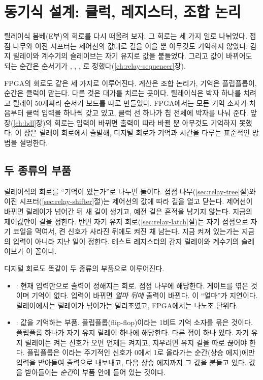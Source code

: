\chapter{동기식 설계: 클럭, 레지스터, 조합 논리}\label{ch:sync}

릴레이식 봄베(E부)의 회로를 다시 떠올려 보자. 그 회로는 세 가지 일로 나뉘었다. 접점 나무와 이진 시프터는
제어선의 값대로 길을 이을 뿐 아무것도 기억하지 않았다. 감지 릴레이와 계수기의 슬레이브는 자기 유지로 값을
붙들었다. 그리고 값이 바뀌어도 되는 순간은 순서기가 , , , 로
정했다(\ref{ch:relay-sequencer}장).

FPGA의 회로도 같은 세 가지로 이루어진다. 계산은 조합 논리가, 기억은 플립플롭이, 순간은 클럭이 맡는다.
다른 것은 대가를 치르는 곳이다. 릴레이식은 박자 하나를 치려고 릴레이 50개짜리 순서기 보드를 따로 만들었다.
FPGA에서는 모든 기억 소자가 처음부터 클럭 입력을 하나씩 갖고 있고, 클럭 선 하나가 칩 전체에 박자를 나눠
준다. 앞 장(\ref{ch:hdl}장)의 회로는 입력이 바뀌면 출력이 따라 바뀔 뿐 아무것도 기억하지 못했다. 이 장은
릴레이 회로에서 출발해, 디지털 회로가 기억과 시간을 다루는 표준적인 방법을 설명한다.

\section{두 종류의 부품}

\Relay 릴레이식의 회로를 ``기억이 있는가''로 나누면 둘이다. 접점 나무(\ref{sec:relay-tree}절)와 이진
시프터(\ref{sec:relay-shifter}절)는 제어선의 값에 따라 길을 열고 닫는다. 제어선이 바뀌면 릴레이가 넘어간 뒤
새 길이 생기고, 예전 길은 흔적을 남기지 않는다. 지금의 제어값만이 길을 정한다. 반면 자기 유지
회로(\ref{sec:relay-latch}절)는 자기 접점으로 자기 코일을 먹여서, 켠 신호가 사라진 뒤에도 켜진 채 남는다.
지금 켜져 있는가는 지금의 입력이 아니라 지난 일이 정한다. 테스트 레지스터의 감지 릴레이와 계수기의 슬레이브가
이 꼴이다.

디지털 회로도 똑같이 두 종류의 부품으로 이루어진다.

\begin{itemize}
\item {}: 현재 입력만으로 출력이 정해지는 회로. 접점 나무에 해당한다.
게이트를 엮은 것이며 기억이 없다. 입력이 바뀌면 \emph{얼마 뒤에} 출력이 바뀐다. 이 ``얼마''가 지연이다.
릴레이에서는 릴레이가 넘어가는 밀리초였고, FPGA에서는 나노초 단위다.
\item {}: 값을 기억하는 부품. 플립플롭(flip-flop)이라는 1비트 기억 소자를 묶은
것이다. 플립플롭 하나가 자기 유지 릴레이 하나에 해당한다. 다른 점이 하나 있다. 자기 유지 릴레이는 켜는
신호가 오면 언제든 켜지고, 지우려면 유지 길을 따로 끊어야 한다. 플립플롭은 이라는
주기적인 신호가 0에서 1로 올라가는 순간(상승 에지)에만 입력을 받아들여 출력으로 내보내고, 다음 상승 에지까지
그 값을 붙들고 있다. 값을 받아들이는 \emph{순간}이 부품 안에 들어 있는 것이다.
\end{itemize}

